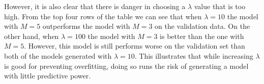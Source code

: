 \documentclass[10pt]{article}
\begin{document}
\medskip

However, it is also clear that there is danger in choosing a $\lambda$ value that is too high. From the top four rows of the table we can see that when $\lambda=10$ the model with $M=5$ outperforms the model with $M=3$ on the validation data. On the other hand, when $\lambda=100$ the model with $M=3$ is better than the one with $M=5$. However, this model is still performs worse on the validation set than both of the models generated with $\lambda = 10$. This illustrates that while increasing $\lambda$ is good for preventing overfitting, doing so runs the risk of generating a model with little predictive power.
\end{document}
